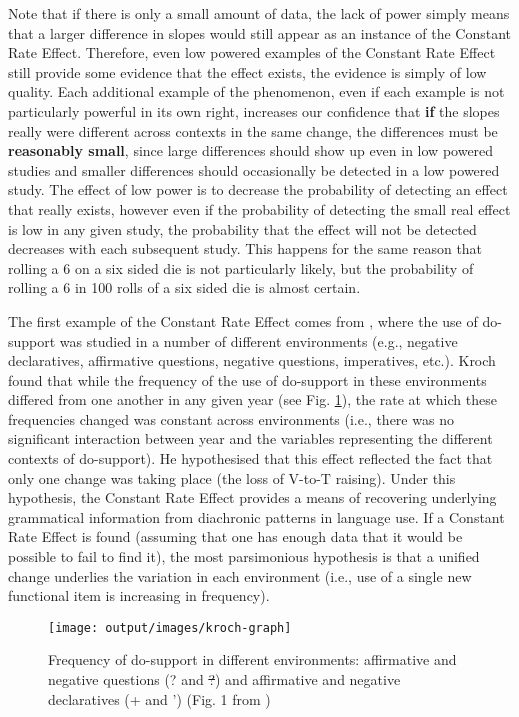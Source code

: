 	Note that if there is only a small amount of data, the lack of power simply means that a larger difference in slopes would still appear as an instance of the Constant Rate Effect. Therefore, even low powered examples of the Constant Rate Effect still provide some evidence that the effect exists, the evidence is simply of low quality. Each additional example of the phenomenon, even if each example is not particularly powerful in its own right, increases our confidence that \textbf{if} the slopes really were different across contexts in the same change, the differences must be \textbf{reasonably small}, since large differences should show up even in low powered studies and smaller differences should occasionally be detected in a low powered study. The effect of low power is to decrease the probability of detecting an effect that really exists, however even if the probability of detecting the small real effect is low in any given study, the probability that the effect will not be detected decreases with each subsequent study. This happens for the same reason that rolling a 6 on a six sided die is not particularly likely, but the probability of rolling a 6 in 100 rolls of a six sided die is almost certain.

	The first example of the Constant Rate Effect comes from \cite{Kroch.1989}, where the use of do-support was studied in a number of different environments (e.g., negative declaratives, affirmative questions, negative questions, imperatives, etc.). Kroch found that while the frequency of the use of do-support in these environments differed from one another in any given year (see Fig. \ref{fig:kroch-graph}), the rate at which these frequencies changed was constant across environments (i.e., there was no significant interaction between year and the variables representing the different contexts of do-support). He hypothesised that this effect reflected the fact that only one change was taking place (the loss of V-to-T raising). Under this hypothesis, the Constant Rate Effect provides a means of recovering underlying grammatical information from diachronic patterns in language use. If a Constant Rate Effect is found (assuming that one has enough data that it would be possible to fail to find it), the most parsimonious hypothesis is that a unified change underlies the variation in each environment (i.e., use of a single new functional item is increasing in frequency).

	\begin{figure}[ht!]
		\texttt{[image: output/images/kroch-graph]}
		\caption{Frequency of do-support in different environments: affirmative and negative questions (? and \sout{?}) and affirmative and negative declaratives (+ and ') (Fig. 1 from \citealt{Kroch.1989})}
		\label{fig:kroch-graph}
	\end{figure}

